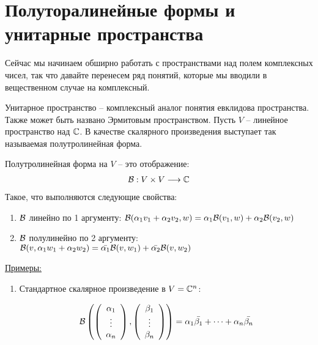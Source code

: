 \section{Полуторалинейные формы и унитарные пространства}
Сейчас мы начинаем обширно работать с пространствами над полем комплексных чисел, так что 
давайте перенесем ряд понятий, которые мы вводили в вещественном случае на комплексный. 

Унитарное пространство -- комплексный аналог понятия евклидова пространства. Также может быть названо 
Эрмитовым пространством. Пусть $V$ -- линейное пространство над $\mathbb{C}$. В качестве скалярного произведения выступает так 
называемая полутролинейная форма. 

\begin{conj}
    Полутролинейная форма на $V$ -- это отображение: 
    \begin{gather*}
        \mathcal{B}: V \times V \longrightarrow \mathbb{C}
    \end{gather*}
    Такое, что выполняются следующие свойства: 
    \begin{enumerate}
        \item $\mathcal{B}$ линейно по 1 аргументу: $\mathcal{B}(\alpha_1 v_1 + \alpha_2 v_2, w) = \alpha_1 \mathcal{B}(v_1, w) + \alpha_2 \mathcal{B}(v_2, w)$
        \item $\mathcal{B}$ полулинейно по 2 аргументу: $\mathcal{B}(v, \alpha_1 w_1 + \alpha_2 w_2) = \bar{\alpha_1} \mathcal{B}(v, w_1) + \bar{\alpha_2}\mathcal{B}(v, w_2)$
    \end{enumerate}
    \underline{Примеры:}
    \begin{enumerate}
        \item Стандартное скалярное произведение в $V = \mathbb{C}^n$:
        
        \begin{gather*}
            \mathcal{B}\left(\left(\begin{array}{c}
            \alpha_1 \\ 
            \vdots \\ 
            \alpha_n
            \end{array}\right), 
            \left(\begin{array}{c}
            \beta_1 \\ 
            \vdots \\ 
            \beta_n
            \end{array}\right)\right) 
            = \alpha_1 \bar{\beta_1} + \dots + \alpha_n \bar{\beta_n}
        \end{gather*}


\end{enumerate}
\end{conj}
